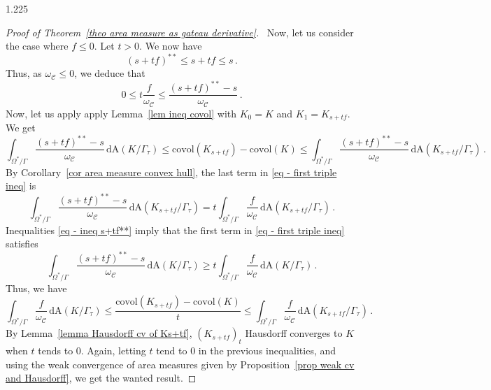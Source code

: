 \documentclass[reqno, a4paper]{amsart}
\numberwithin{equation}{section}
\numberwithin{figure}{section}
\theoremstyle{definition}
\theoremstyle{remark}
\newcommand{\dif}{\mathrm{d}} %
\newcommand{\C}{\mathcal{C}} %
\newcommand{\covol}{\mathrm{covol}} %
\newcommand{\Area}{\mathrm{A}} %
\begin{document}
\begin{spacing}{1.225}
\begin{proof}[Proof of Theorem~\ref{theo area measure as gateau derivative}]
\noindent \textbullet\ Now, let us consider the case where $f \leq 0$. Let $t>0$. We now have 
\begin{equation*}
 (s+tf)^{**} \leq s+tf \leq s \, . 
\end{equation*}
Thus, as $\omega_\C \leq 0$, we deduce that 
\begin{equation}
\label{eq - ineq s+tf**}
 0 \leq t \frac{f}{\omega_\C} \leq \frac{(s+tf)^{**}-s}{\omega_\C} \, . 
\end{equation}
Now, let us apply apply Lemma~\ref{lem ineq covol} with $K_0=K$ and $K_1= K_{s+tf}$. We get
\begin{equation}
\label{eq - first triple ineq}
 \int_{\Omega^*/\Gamma} \frac{(s+tf)^{**} - s}{\omega_\C} \,\dif \Area(K/\Gamma_\tau) \leq \covol(K_{s+tf}) - \covol(K) \leq \int_{\Omega^*/\Gamma} \frac{(s+tf)^{**} - s}{\omega_\C} \,\dif \Area(K_{s+tf}/\Gamma_\tau) \, . 
 \end{equation}
By Corollary~\ref{cor area measure convex hull}, the last term in \eqref{eq - first triple ineq} is 
\begin{equation*}
\int_{\Omega^*/\Gamma} \frac{(s+tf)^{**} -s}{\omega_\C} \,\dif \Area(K_{s+tf}/\Gamma_\tau) =t \int_{\Omega^*/\Gamma} \frac{f}{\omega_\C} \,\dif \Area(K_{s+tf}/\Gamma_\tau) \, . 
\end{equation*}
Inequalities \eqref{eq - ineq s+tf**} imply that the first term in \eqref{eq - first triple ineq} satisfies
\begin{equation*}
\int_{\Omega^*/\Gamma} \frac{(s+tf)^{**}-s}{\omega_\C} \,\dif \Area(K/\Gamma_\tau) \geq t \int_{\Omega^*/\Gamma} \frac{f}{\omega_\C} \,\dif \Area(K/\Gamma_\tau) \, . 
\end{equation*}
Thus, we have 
\begin{equation*}
\int_{\Omega^*/\Gamma} \frac{f}{\omega_\C} \, \dif \Area(K/\Gamma_\tau) \leq \frac{\covol (K_{s+tf})-\covol(K)}{t} \leq \int_{\Omega^*/\Gamma} \frac{f}{\omega_\C} \, \dif \Area(K_{s+tf}/\Gamma_\tau) \, . 
\end{equation*}
By Lemma~\ref{lemma Hausdorff cv of Ks+tf}, $(K_{s+tf})_t$ Hausdorff converges to $K$ when $t$ tends to $0$. Again, letting $t$ tend to $0$ in the previous inequalities, and using the weak convergence of area measures given by Proposition~\ref{prop weak cv and Hausdorff}, we get the wanted result. 


\end{proof}
\end{spacing}
\end{document}
